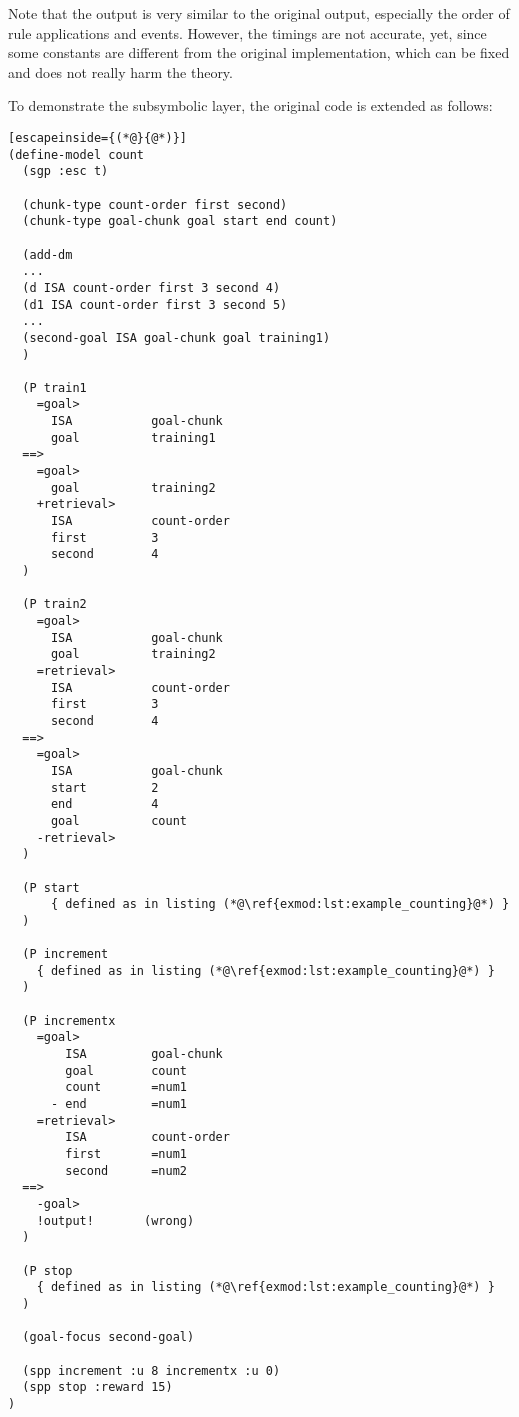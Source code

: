 Note that the output is very similar to the original output, especially the order of rule applications and events. However, the timings are not accurate, yet, since some constants are different from the original implementation, which can be fixed and does not really harm the theory. 

To demonstrate the subsymbolic layer, the original code is extended as follows:

\raggedbottom
\begin{lstlisting}[escapeinside={(*@}{@*)}]
(define-model count
  (sgp :esc t)

  (chunk-type count-order first second)
  (chunk-type goal-chunk goal start end count)

  (add-dm
  ...
  (d ISA count-order first 3 second 4)
  (d1 ISA count-order first 3 second 5)
  ...
  (second-goal ISA goal-chunk goal training1)
  )
  
  (P train1
    =goal>
      ISA           goal-chunk
      goal          training1
  ==>
    =goal>
      goal          training2
    +retrieval>
      ISA           count-order
      first         3
      second        4
  )

  (P train2
    =goal>
      ISA           goal-chunk
      goal          training2
    =retrieval>
      ISA           count-order
      first         3
      second        4
  ==>
    =goal>
      ISA           goal-chunk
      start         2
      end           4
      goal          count
    -retrieval> 
  )
  
  (P start
      { defined as in listing (*@\ref{exmod:lst:example_counting}@*) }
  )

  (P increment
    { defined as in listing (*@\ref{exmod:lst:example_counting}@*) }
  )

  (P incrementx
    =goal>
        ISA         goal-chunk
        goal        count
        count       =num1
      - end         =num1
    =retrieval>
        ISA         count-order
        first       =num1
        second      =num2
  ==>
    -goal>
    !output!       (wrong)
  )

  (P stop
    { defined as in listing (*@\ref{exmod:lst:example_counting}@*) }
  )

  (goal-focus second-goal)

  (spp increment :u 8 incrementx :u 0)
  (spp stop :reward 15)
)
\end{lstlisting}
\flushbottom

